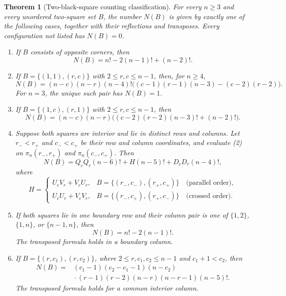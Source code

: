 \documentclass[11pt]{article}
\newtheorem{theorem}{Theorem}
\begin{document}
\begin{theorem}[Two-black-square counting classification]\label{thm:main}
For every $n\geq3$ and every unordered two-square set $B$, the number $N(B)$
is given by exactly one of the following cases, together with their reflections
and transposes.  Every configuration not listed has $N(B)=0$.

\begin{enumerate}
\item If $B$ consists of opposite corners, then
\[
       N(B)=n!-2(n-1)!+(n-2)!.                               \tag{O}
\]

\item If $B=\{(1,1),(r,c)\}$ with $2\leq r,c\leq n-1$, then,
for $n\geq4$,
\[
 N(B)=(n-c)(n-r)(n-4)!
       \bigl((c-1)(r-1)(n-3)-(c-2)(r-2)\bigr).               \tag{C}
\]
For $n=3$, the unique such pair has $N(B)=1$.

\item If $B=\{(1,c),(r,1)\}$ with $2\leq r,c\leq n-1$, then
\[
 N(B)=(n-c)(n-r)
       \bigl((c-2)(r-2)(n-3)!+(n-2)!\bigr).                 \tag{E}
\]

\item Suppose both squares are interior and lie in distinct rows and
columns.  Let $r_-<r_+$ and $c_-<c_+$ be their row and column coordinates,
and evaluate (2) on $\pi_n(r_-,r_+)$ and $\pi_n(c_-,c_+)$.  Then
\[
 N(B)=Q_cQ_r(n-6)!+H(n-5)!+D_cD_r(n-4)!,                    \tag{I}
\]
where
\[
H=\begin{cases}
 U_cV_r+V_cU_r,&B=\{(r_-,c_-),(r_+,c_+)\}\quad
                  \text{(parallel order)},\\
 U_cU_r+V_cV_r,&B=\{(r_-,c_+),(r_+,c_-)\}\quad
                  \text{(crossed order)}.
\end{cases}                                                  \tag{4}
\]

\item If both squares lie in one boundary row and their column pair is one
of $\{1,2\}$, $\{1,n\}$, or $\{n-1,n\}$, then
\[
       N(B)=n!-2(n-1)!.                                      \tag{B}
\]
The transposed formula holds in a boundary column.

\item If $B=\{(r,c_1),(r,c_2)\}$, where
$2\leq r,c_1,c_2\leq n-1$ and $c_1+1<c_2$, then
\begin{align*}
N(B)={}&(c_1-1)(c_2-c_1-1)(n-c_2)\\
 &\mathrel{}\cdot(r-1)(r-2)(n-r)(n-r-1)(n-5)!.              \tag{S}
\end{align*}
The transposed formula holds for a common interior column.
\end{enumerate}
\end{theorem}
\end{document}

